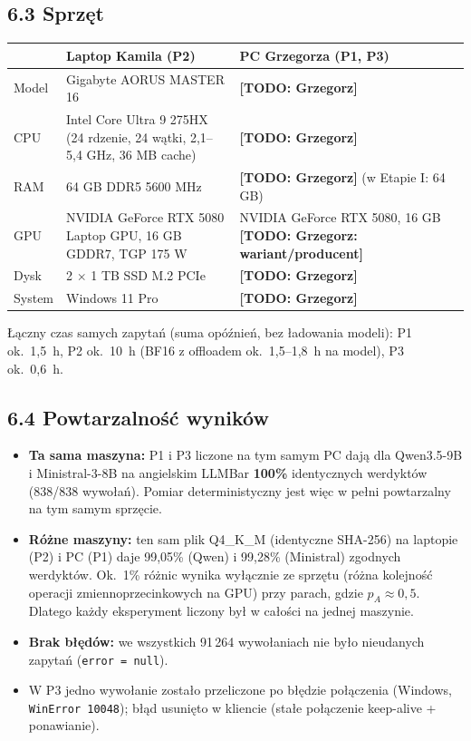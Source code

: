 \documentclass[10pt,a4paper]{article}
\newcommand{\TODO}[1]{{\color{red!75!black}\textbf{[TODO: #1]}}}
\begin{document}
\subsection*{6.3 Sprzęt}
\begin{tabularx}{\linewidth}{@{}l Y Y@{}}
\toprule
 & Laptop Kamila (P2) & PC Grzegorza (P1, P3) \\
\midrule
Model & Gigabyte AORUS MASTER 16 & \TODO{Grzegorz} \\
CPU & Intel Core Ultra 9 275HX (24 rdzenie, 24 wątki, 2,1--5,4 GHz, 36 MB cache) & \TODO{Grzegorz} \\
RAM & 64 GB DDR5 5600 MHz & \TODO{Grzegorz} (w Etapie I: 64 GB) \\
GPU & NVIDIA GeForce RTX 5080 Laptop GPU, 16 GB GDDR7, TGP 175 W & NVIDIA GeForce RTX 5080, 16 GB \TODO{Grzegorz: wariant/producent} \\
Dysk & 2 $\times$ 1 TB SSD M.2 PCIe & \TODO{Grzegorz} \\
System & Windows 11 Pro & \TODO{Grzegorz} \\
\bottomrule
\end{tabularx}

Łączny czas samych zapytań (suma opóźnień, bez ładowania modeli): P1 ok.~1,5~h, P2 ok.~10~h (BF16 z offloadem ok.~1,5--1,8~h na model), P3 ok.~0,6~h.

\subsection*{6.4 Powtarzalność wyników}
\begin{itemize}
  \item \textbf{Ta sama maszyna:} P1 i P3 liczone na tym samym PC dają dla Qwen3.5-9B i Ministral-3-8B na angielskim LLMBar \textbf{100\%} identycznych werdyktów (838/838 wywołań). Pomiar deterministyczny jest więc w pełni powtarzalny na tym samym sprzęcie.
  \item \textbf{Różne maszyny:} ten sam plik Q4\_K\_M (identyczne SHA-256) na laptopie (P2) i PC (P1) daje 99,05\% (Qwen) i 99,28\% (Ministral) zgodnych werdyktów. Ok.~1\% różnic wynika wyłącznie ze sprzętu (różna kolejność operacji zmiennoprzecinkowych na GPU) przy parach, gdzie $p_A\approx0{,}5$. Dlatego każdy eksperyment liczony był w całości na jednej maszynie.
  \item \textbf{Brak błędów:} we wszystkich 91\,264 wywołaniach nie było nieudanych zapytań (\texttt{error = null}).
  \item W P3 jedno wywołanie zostało przeliczone po błędzie połączenia (Windows, \texttt{WinError 10048}); błąd usunięto w kliencie (stałe połączenie keep-alive + ponawianie).
\end{itemize}
\end{document}
